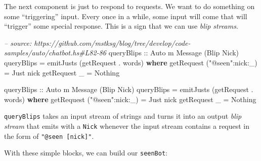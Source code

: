 \documentclass[]{article}
\newenvironment{Shaded}{}{}
\newcommand{\KeywordTok}[1]{\textcolor[rgb]{0.00,0.44,0.13}{\textbf{{#1}}}}
\newcommand{\DataTypeTok}[1]{\textcolor[rgb]{0.56,0.13,0.00}{{#1}}}
\newcommand{\StringTok}[1]{\textcolor[rgb]{0.25,0.44,0.63}{{#1}}}
\newcommand{\CommentTok}[1]{\textcolor[rgb]{0.38,0.63,0.69}{\textit{{#1}}}}
\newcommand{\OtherTok}[1]{\textcolor[rgb]{0.00,0.44,0.13}{{#1}}}
\newcommand{\FunctionTok}[1]{\textcolor[rgb]{0.02,0.16,0.49}{{#1}}}
\newcommand{\NormalTok}[1]{{#1}}
\begin{document}
The next component is just to respond to requests. We want to do something on
some ``triggering'' input. Every once in a while, some input will come that will
``trigger'' some special response. This is a sign that we can use \emph{blip
streams}.

\begin{Shaded}
\begin{Highlighting}[]
\CommentTok{-- source: https://github.com/mstksg/blog/tree/develop/code-samples/auto/chatbot.hs#L82-86}
\OtherTok{    queryBlips ::} \DataTypeTok{Auto} \NormalTok{m }\DataTypeTok{Message} \NormalTok{(}\DataTypeTok{Blip} \DataTypeTok{Nick}\NormalTok{)}
    \NormalTok{queryBlips }\FunctionTok{=} \NormalTok{emitJusts (getRequest }\FunctionTok{.} \NormalTok{words)}
      \KeywordTok{where}
        \NormalTok{getRequest (}\StringTok{"@seen"}\FunctionTok{:}\NormalTok{nick}\FunctionTok{:}\NormalTok{_) }\FunctionTok{=} \DataTypeTok{Just} \NormalTok{nick}
        \NormalTok{getRequest _                }\FunctionTok{=} \DataTypeTok{Nothing}



\OtherTok{queryBlips ::} \DataTypeTok{Auto} \NormalTok{m }\DataTypeTok{Message} \NormalTok{(}\DataTypeTok{Blip} \DataTypeTok{Nick}\NormalTok{)}
\NormalTok{queryBlips }\FunctionTok{=} \NormalTok{emitJusts (getRequest }\FunctionTok{.} \NormalTok{words)}
  \KeywordTok{where}
    \NormalTok{getRequest (}\StringTok{"@seen"}\FunctionTok{:}\NormalTok{nick}\FunctionTok{:}\NormalTok{_) }\FunctionTok{=} \DataTypeTok{Just} \NormalTok{nick}
    \NormalTok{getRequest _                }\FunctionTok{=} \DataTypeTok{Nothing}
\end{Highlighting}
\end{Shaded}

\texttt{queryBlips} takes an input stream of strings and turns it into an output
\emph{blip stream} that emits with a \texttt{Nick} whenever the input stream
contains a request in the form of \texttt{"@seen\ {[}nick{]}"}.

With these simple blocks, we can build our \texttt{seenBot}:
\end{document}
